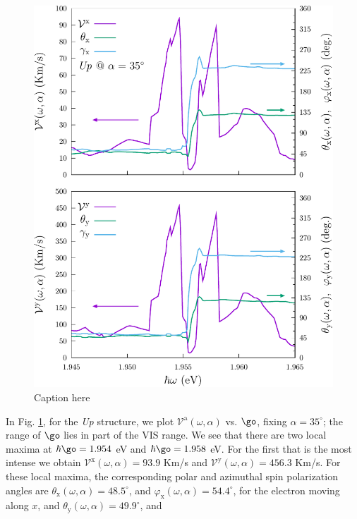 \documentclass[prb,11pt,tightenlines,twocolumn,aps]{revtex4-1}
\begin{document}
\begin{figure}[t]
    \centering
    \includegraphics[width=\linewidth]{upplots/up-vx-vy-w2}
    \caption{Caption here}
    \label{fig:up-vx-vy-w2}
\end{figure}
In  Fig. \ref{fig:up-vx-vy-w2}, for the \emph{Up} structure, we plot
$\mathcal{V}^{\mathrm{a}} (\omega,\alpha)$ vs. $\go$, fixing
$\alpha=35^{\circ}$; the range of $\go$ lies in part of the VIS range. We see
that there are two local maxima at $\hbar\go=1.954$ eV and $\hbar\go=1.958$ eV.
For the first that is the most intense we obtain
% 
$\mathcal{V}^{\mathrm{x}} (\omega,\alpha) =  93.9$ Km/s and  
$\mathcal{V}^{\mathrm{y}} (\omega,\alpha) = 456.3$ Km/s.
% 
For these local maxima, the corresponding polar and azimuthal spin polarization
angles are
% 
$\theta_{\mathrm{x}} (\omega,\alpha) = 48.5^{\circ}$, and 
$\varphi_{\mathrm{x}} (\omega,\alpha) = 54.4^{\circ}$,
% 
for the electron moving along $x$, and
% 
$\theta_{\mathrm{y}} (\omega,\alpha) = 49.9^{\circ}$, and 
\end{document}
